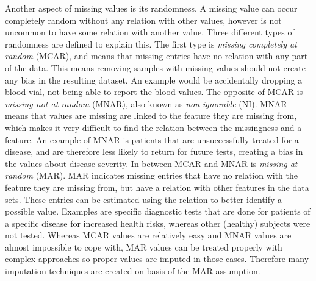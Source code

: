 \documentclass[10pt,a4paper]{report}
\begin{document}
	Another aspect of missing values is its randomness. A missing value can occur completely random without any relation with other values, however is not uncommon to have some relation with another value. Three different types of randomness are defined to explain this. The first type is \textit{missing completely at random} (MCAR)\cite{donders2006gentle,cartwright2003dealing, haukoos2007advanced}, and means that missing entries have no relation with any part of the data. This means removing samples with missing values should not create any bias in the resulting dataset. An example would be accidentally dropping a blood vial, not being able to report the blood values. The opposite of MCAR is \textit{missing not at random} (MNAR)\cite{donders2006gentle, haukoos2007advanced}, also known as \textit{non ignorable} (NI)\cite{cartwright2003dealing}. MNAR means that values are missing are linked to the feature they are missing from, which makes it very difficult to find the relation between the missingness and a feature. An example of MNAR is patients that are unsuccessfully treated for a disease, and are therefore less likely to return for future tests, creating a bias in the values about disease severity. In between MCAR and MNAR is \textit{missing at random} (MAR)\cite{donders2006gentle,cartwright2003dealing, haukoos2007advanced}. MAR indicates missing entries that have no relation with the feature they are missing from, but have a relation with other features in the data sets. These entries can be estimated using the relation to better identify a possible value. Examples are specific diagnostic tests that are done for patients of a specific disease for increased health risks, whereas other (healthy) subjects were not tested\cite{haukoos2007advanced}. Whereas MCAR values are relatively easy and MNAR values are almost impossible to cope with, MAR values can be treated properly with complex approaches so proper values are imputed in those cases. Therefore many imputation techniques are created on basis of the MAR assumption.
	
\end{document}
